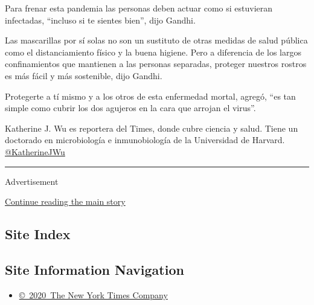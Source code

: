 Para frenar esta pandemia las personas deben actuar como si estuvieran
infectadas, ``incluso si te sientes bien'', dijo Gandhi.

Las mascarillas por sí solas no son un sustituto de otras medidas de
salud pública como el distanciamiento físico y la buena higiene. Pero a
diferencia de los largos confinamientos que mantienen a las personas
separadas, proteger nuestros rostros es más fácil y más sostenible, dijo
Gandhi.

Protegerte a tí mismo y a los otros de esta enfermedad mortal, agregó,
``es tan simple como cubrir los dos agujeros en la cara que arrojan el
virus''.

Katherine J. Wu es reportera del Times, donde cubre ciencia y salud.
Tiene un doctorado en microbiología e inmunobiología de la Universidad
de Harvard. \href{https://twitter.com/KatherineJWu}{@KatherineJWu}

\begin{center}\rule{0.5\linewidth}{\linethickness}\end{center}

Advertisement

\protect\hyperlink{after-bottom}{Continue reading the main story}

\hypertarget{site-index}{%
\subsection{Site Index}\label{site-index}}

\hypertarget{site-information-navigation}{%
\subsection{Site Information
Navigation}\label{site-information-navigation}}

\begin{itemize}
\tightlist
\item
  \href{https://help.nytimes.com/hc/en-us/articles/115014792127-Copyright-notice}{©~2020~The
  New York Times Company}
\end{itemize}

